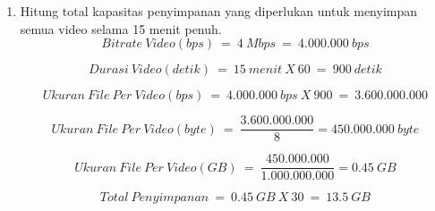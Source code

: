 \documentclass[12pt,a4paper]{article}
\begin{document}
\begin{enumerate}
\begin{enumerate}
      \item Hitung total kapasitas penyimpanan yang diperlukan untuk menyimpan semua
        video selama 15 menit penuh. 
        \[
          Bitrate\ Video(bps)\ =\ 4\ Mbps\ =\ 4.000.000\ bps
        \]

        \[
          Durasi\ Video(detik)\ =\ 15\ menit\ X\ 60\ =\ 900\ detik
        \]

        \[
          Ukuran\ File\ Per\ Video(bps)\ =\ 4.000.000\ bps\ X\ 900\ =\ 3.600.000.000
        \]

        \[
          Ukuran\ File\ Per\ Video(byte)\ =\ \frac{3.600.000.000}{8} = 450.000.000\ byte
        \]

        \[
          Ukuran\ File\ Per\ Video(GB)\ =\ \frac{450.000.000}{1.000.000.000} = 0.45\ GB
        \]

        \[
          Total\ Penyimpanan\ =\ 0.45\ GB\ X\ 30\ =\ 13.5\ GB
        \]


    \end{enumerate}
  \end{enumerate}
\end{document}
